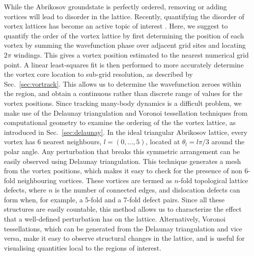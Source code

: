 While the Abrikosov groundstate is perfectly ordered, removing or adding vortices will lead to disorder in the lattice. Recently, quantifying the disorder of vortex lattices has become an active topic of interest \cite{VTX:Mithun_pra_2016,VTX:Rankonjac_pra_2016}. %
Here, we suggest to quantify the order of the vortex lattice by first determining the position of each vortex by summing the wavefunction phase over adjacent grid sites and locating $2\pi$ windings. This gives a vortex position estimated to the nearest numerical grid point. A linear least-squares fit is then performed to more accurately determine the vortex core location to sub-grid resolution, as described by Sec.~\ref{sec:vortrack}. This allows us to determine the wavefunction zeroes within the region, and obtain a continuous rather than discrete range of values for the vortex positions. Since tracking many-body dynamics is a difficult problem, we make use of the Delaunay triangulation and Voronoi tessellation techniques from computational geometry to examine the ordering of the the vortex lattice, as introduced in Sec.~\ref{sec:delaunay}. In the ideal triangular Abrikosov lattice, every vortex has 6 nearest neighbours, $l=(0,\ldots,5)$, located at $\theta_l=l\pi/3$ around the polar angle. Any perturbation that breaks this symmetric arrangement can be easily observed using Delaunay triangulation. This technique generates a mesh from the vortex positions, which makes it easy to check for the presence of non 6-fold neighbouring vortices. These vortices are termed as $n$-fold topological lattice defects, where $n$ is the number of connected edges, and dislocation defects can form when, for example, a 5-fold and a 7-fold defect pairs. Since all these structures are easily countable, this method allows us to characterize the effect that a well-defined perturbation has on the lattice. Alternatively, Voronoi tessellations, which can be generated from the Delaunay triangulation and vice versa, make it easy to observe structural changes in the lattice, and is useful for visualising quantities local to the regions of interest.

